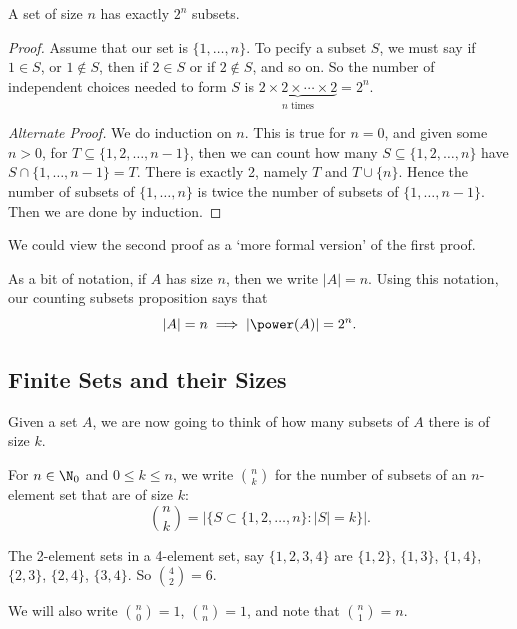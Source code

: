 \documentclass[a4paper]{scrartcl}
\begin{document}
\begin{proposition}
	A set of size $n$ has exactly $2^n$ subsets.
\end{proposition}
\begin{proof}
	Assume that our set is $\{1, \dots, n\}$. To pecify a subset $S$, we must say if $1 \in S$, or $1 \not\in S$, then if $2 \in S$ or if $2 \not\in S$, and so on. So the number of independent choices needed to form $S$ is $\underbrace{2 \times 2 \times \cdots \times 2}_{\text{$n$ times}} = 2^n$.

	\emph{Alternate Proof.}
	We do induction on $n$. This is true for $n = 0$, and given some $n > 0$, for $T \subseteq \{1, 2, \dots, n - 1\}$, then we can count how many $S \subseteq \{1, 2, \dots, n\}$ have $S \cap \{1, \dots, n - 1\} = T$. There is exactly 2, namely $T$ and $T \cup \{n\}$. Hence the number of subsets of $\{1, \dots, n\}$ is twice the number of subsets of $\{1, \dots, n - 1\}$. Then we are done by induction.
\end{proof}
\begin{remark}
	We could view the second proof as a `more formal version' of the first proof.
\end{remark}

As a bit of notation, if $A$ has size $n$, then we write $|A| = n$. Using this notation, our counting subsets proposition says that
$$
|A| = n \implies |\power(A)| = 2^n.
$$

\subsection{Finite Sets and their Sizes}

Given a set $A$, we are now going to think of how many subsets of $A$ there is of size $k$.

\begin{definition}
	For $n \in \N_0$ and $0 \leq k \leq n$, we write $\binom{n}{k}$ for the number of subsets of an $n$-element set that are of size $k$:
	$$
	\binom{n}{k} = \left|\{S \subset \{1, 2, \dots, n\} : |S| = k\}\right|.
	$$
\end{definition}

\begin{example}
	The 2-element sets in a 4-element set, say $\{1, 2, 3, 4\}$ are $\{1, 2\}$, $\{1, 3\}$, $\{1, 4\}$, $\{2, 3\}$, $\{2, 4\}$, $\{3, 4\}$. So $\binom{4}{2} = 6$.
\end{example}

We will also write $\binom{n}{0} = 1$, $\binom{n}{n} = 1$, and note that $\binom{n}{1} = n$.
\end{document}

